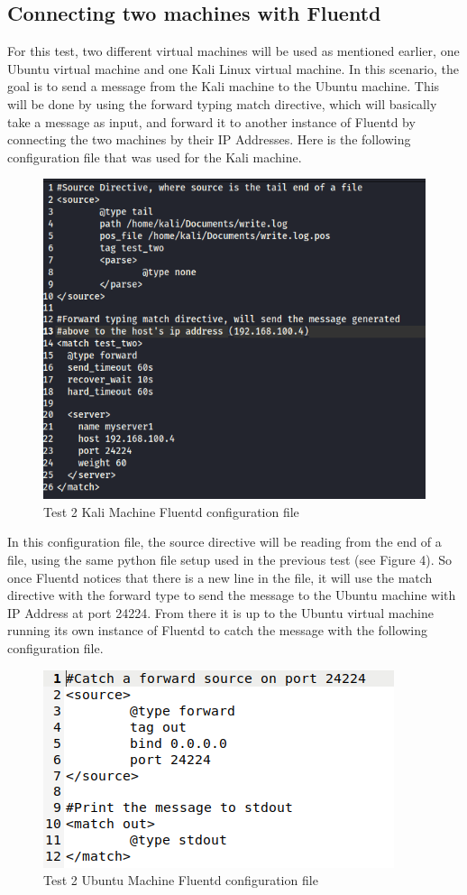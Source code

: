 \documentclass{article}
\begin{document}
\subsection{Connecting two machines with Fluentd}
\quad \quad For this test, two different virtual machines will be used as mentioned earlier, one Ubuntu virtual machine and one Kali Linux virtual machine. In this scenario, the goal is to send a message from the Kali machine to the Ubuntu machine. This will be done
by using the forward typing match directive, which will basically take a message as input, and forward it to another instance of Fluentd by connecting the two machines by their IP Addresses. Here is the following configuration file that was used for the Kali machine.
\begin{figure}[H]
    \centering
    \includegraphics[scale=0.75]{images/t2_1.png}
    \caption{Test 2 Kali Machine Fluentd configuration file}
    \label{fig:pic7}
\end{figure}
In this configuration file, the source directive will be reading from the end of a file, using the same python file setup used in the previous test (see Figure 4). So once Fluentd notices that there is a new line in the file, it will
use the match directive with the forward type to send the message to the Ubuntu machine with IP Address  at port 24224. From there it is up to the Ubuntu virtual machine running its own instance of Fluentd to catch the message with the following configuration file.
\begin{figure}[H]
    \centering
    \includegraphics[scale=1]{images/t2_2.png}
    \caption{Test 2 Ubuntu Machine Fluentd configuration file}
    \label{fig:pic8}
\end{figure}
\end{document}
